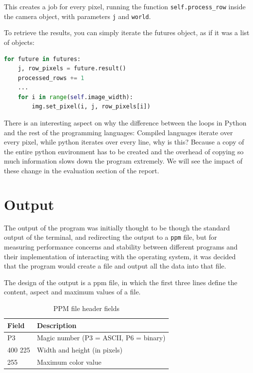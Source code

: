 This creates a job for every pixel, running the function \texttt{self.process\_row} inside the camera object, with parameters \texttt{j} and \texttt{world}.

To retrieve the results, you can simply iterate the futures object, as if it was a list of objects:
\begin{lstlisting}[language=Python, caption={Python retieving data from Process execution pool.}, label={lst:python_executor_retrieve}]
for future in futures:
    j, row_pixels = future.result()
    processed_rows += 1
    ...
    for i in range(self.image_width):
        img.set_pixel(i, j, row_pixels[i])
\end{lstlisting}


There is an interesting aspect on why the difference between the loops in Python and the rest of the programming languages: Compiled languages iterate over every pixel, while python iterates over every line, why is this? Because a copy of the entire python environment has to be created and the overhead of copying so much information slows down the program extremely. We will see the impact of these change in the evaluation section of the report.

\section{Output}

The output of the program was initially thought to be though the standard output of the terminal, and redirecting the output to a \texttt{\gls{ppm}} file, but for measuring performance concerns and stability between different programs and their implementation of interacting with the operating system, it was decided that the program would create a file and output all the data into that file.

The design of the output is a \gls{ppm} file, in which the first three lines define the content, aspect and maximum values of a file. 
\begin{table}[H]
  \begin{tabular}{@{}ll@{}}
    \toprule
    Field        & Description                                 \\
    \midrule
    P3           & Magic number (P3 = ASCII, P6 = binary)      \\
    400 225      & Width and height (in pixels)                \\
    255          & Maximum color value                         \\
    \bottomrule
  \end{tabular}
  \caption{PPM file header fields}
  \label{tab:ppm-header}
\end{table}

